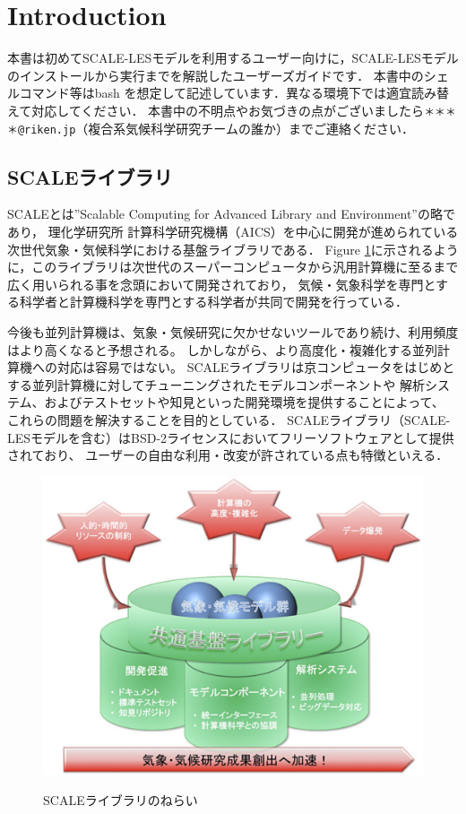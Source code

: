 \section{Introduction}

本書は初めてSCALE-LESモデルを利用するユーザー向けに，SCALE-LESモデルのインストールから実行までを解説したユーザーズガイドです．
本書中のシェルコマンド等はbash を想定して記述しています．異なる環境下では適宜読み替えて対応してください．
本書中の不明点やお気づきの点がございましたら\verb|＊＊＊＊@riken.jp|（複合系気候科学研究チームの誰か）までご連絡ください．

\subsection{SCALEライブラリ}
SCALEとは''Scalable Computing for Advanced Library and Environment''の略であり，
理化学研究所 計算科学研究機構（AICS）を中心に開発が進められている次世代気象・気候科学における基盤ライブラリである．
Figure \ref{fig:scale}に示されるように，このライブラリは次世代のスーパーコンピュータから汎用計算機に至るまで広く用いられる事を念頭において開発されており，
気候・気象科学を専門とする科学者と計算機科学を専門とする科学者が共同で開発を行っている．

今後も並列計算機は、気象・気候研究に欠かせないツールであり続け、利用頻度はより高くなると予想される。
しかしながら、より高度化・複雑化する並列計算機への対応は容易ではない。
SCALEライブラリは京コンピュータをはじめとする並列計算機に対してチューニングされたモデルコンポーネントや
解析システム、およびテストセットや知見といった開発環境を提供することによって、
これらの問題を解決することを目的としている．
SCALEライブラリ（SCALE-LESモデルを含む）はBSD-2ライセンスにおいてフリーソフトウェアとして提供されており、
ユーザーの自由な利用・改変が許されている点も特徴といえる．

\begin{figure}[t]
\begin{center}
  \includegraphics[width=0.6\hsize]{./figure/library.eps}\\
  \caption{SCALEライブラリのねらい}
  \label{fig:scale}
\end{center}
\end{figure}



